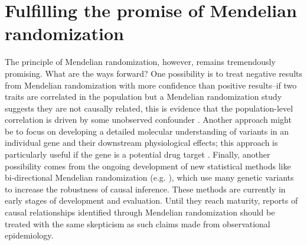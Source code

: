 \documentclass[11pt,titlepage]{article}
\begin{document}
\section{Fulfilling the promise of Mendelian randomization}
The principle of Mendelian randomization, however, remains tremendously promising. What are the ways forward? One possibility is to treat negative results from Mendelian randomization with more confidence than positive results--if two traits are correlated in the population but a Mendelian randomization study suggests they are not causally related, this is evidence that the population-level correlation is driven by some unobserved confounder \citep{VanderWeele:2014aa}. Another approach might be to focus on developing a detailed molecular understanding of variants in an individual gene and their downstream physiological effects; this approach is particularly useful if the gene is a potential drug target \citep{Plenge:2013aa}. Finally, another possibility comes from the ongoing development of new statistical methods like bi-directional Mendelian randomization (e.g. \citep{Timpson:2011aa, Vimaleswaran:2013aa}), which use many genetic variants to increase the robustness of causal inference. These methods are currently in early stages of development and evaluation. Until they reach maturity, reports of causal relationships identified through Mendelian randomization should be treated with the same skepticism as such claims made from observational epidemiology. 

\clearpage
\end{document}
